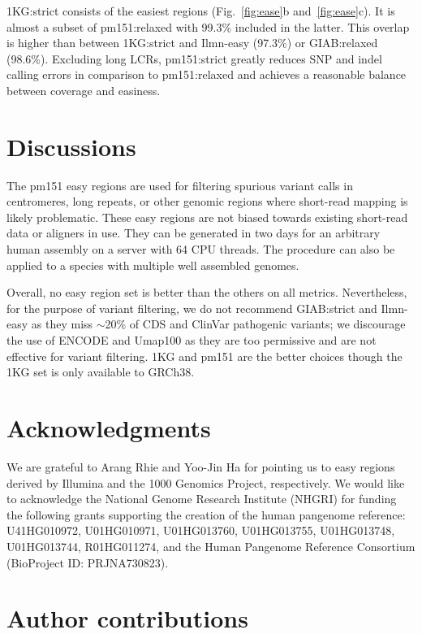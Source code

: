 \documentclass[webpdf,contemporary,large,namedate]{oup-authoring-template}%
\begin{document}
1KG:strict consists of the easiest regions (Fig.~\ref{fig:ease}b and~\ref{fig:ease}c).
It is almost a subset of pm151:relaxed with 99.3\% included in the latter.
This overlap is higher than between 1KG:strict and Ilmn-easy (97.3\%) or GIAB:relaxed (98.6\%).
Excluding long LCRs,
pm151:strict greatly reduces SNP and indel calling errors in comparison to pm151:relaxed
and achieves a reasonable balance between coverage and easiness.

\section{Discussions}

The pm151 easy regions are used for filtering spurious variant calls in centromeres, long repeats,
or other genomic regions where short-read mapping is likely problematic.
These easy regions are not biased towards existing short-read data or aligners in use.
They can be generated in two days for an arbitrary human assembly on a server with 64 CPU threads.
The procedure can also be applied to a species with multiple well assembled genomes.

Overall, no easy region set is better than the others on all metrics.
Nevertheless, for the purpose of variant filtering,
we do not recommend GIAB:strict and Ilmn-easy as they miss $\sim$20\% of CDS and ClinVar pathogenic variants;
we discourage the use of ENCODE and Umap100 as they are too permissive
and are not effective for variant filtering.
1KG and pm151 are the better choices
though the 1KG set is only available to GRCh38.

\section*{Acknowledgments}

We are grateful to Arang Rhie and Yoo-Jin Ha for pointing us to easy regions
derived by Illumina and the 1000 Genomics Project, respectively.
We would like to acknowledge the National Genome Research Institute (NHGRI) for
funding the following grants supporting the creation of the human pangenome
reference: U41HG010972, U01HG010971, U01HG013760, U01HG013755, U01HG013748,
U01HG013744, R01HG011274, and the Human Pangenome Reference Consortium
(BioProject ID: PRJNA730823).

\section*{Author contributions}
\end{document}
